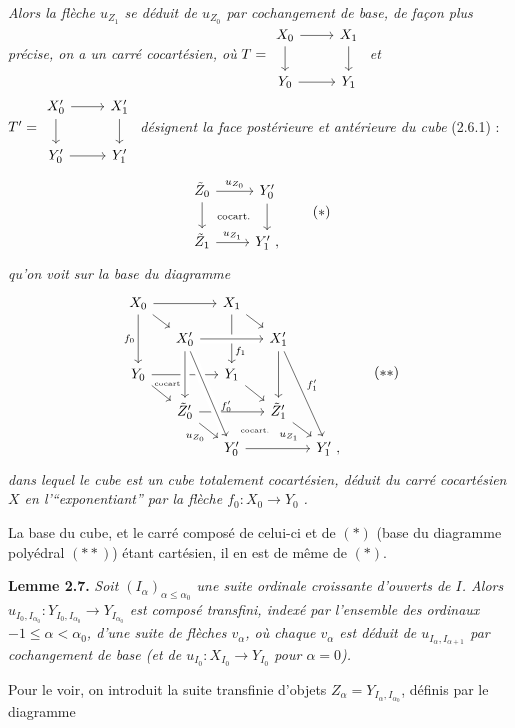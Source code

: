 \documentclass[11pt]{article}
\newcommand{\printedpage}[1]{\marginpar{\footnotesize p.~#1}}
\newcommand{\msp}[1]{\marginpar{\footnotesize [#1]}}
\begin{document}
\printedpage{18}

\msp{page 32}

\textit{Alors la flèche $u_{Z_1}$ se déduit de $u_{Z_0}$ par cochangement de base, de façon plus précise, on a un carré cocartésien, où} $T = \begin{tikzcd}[ampersand replacement=\&, baseline=(\tikzcdmatrixname.center)]
X_0 \arrow[r] \arrow[d] \& X_1 \arrow[d] \\
Y_0 \arrow[r] \& Y_1
\end{tikzcd}$ \textit{et} $T' = \begin{tikzcd}[ampersand replacement=\&, baseline=(\tikzcdmatrixname.center)]
X'_0 \arrow[r] \arrow[d] \& X'_1 \arrow[d] \\
Y'_0 \arrow[r] \& Y'_1
\end{tikzcd}$ \textit{désignent la face postérieure et antérieure du cube} \textup{(2.6.1) :}
\[
\begin{tikzcd}
\tilde{Z}_0 \arrow[r, "u_{Z_0}"] \arrow[d] \arrow[dr, phantom, "\text{\scriptsize cocart.}"] & Y'_0 \arrow[d] \\
\tilde{Z}_1 \arrow[r, "u_{Z_1}"] & Y'_1 \ ,
\end{tikzcd}
\tag*{$(*)$}
\]
\textit{qu'on voit sur la base du diagramme}
\[
\begin{tikzcd}[row sep=small, column sep=small]
X_0 \arrow[rr] \arrow[dr] \arrow[dd, "f_0"'] & & X_1 \arrow[dr] \arrow[dd, "f_1" near end] & & \\
 & X'_0 \arrow[rr, crossing over] & & X'_1 \arrow[dd] \arrow[dddr, "f'_1"] & \\
Y_0 \arrow[rr] \arrow[dr] \arrow[dr, phantom, shift left=2ex, "\text{\tiny cocart.}"] & & Y_1 \arrow[dr] & & \\
 & \tilde{Z}'_0 \arrow[rr] \arrow[dr, "u_{Z_0}"'] \arrow[from=uu, crossing over] & & \tilde{Z}'_1 \arrow[dr, "u_{Z_1}"'] & \\
 & & Y'_0 \arrow[rr] \arrow[from=uuul, crossing over, "f'_0" near end] \arrow[ur, phantom, "\text{\tiny cocart.}"] & & Y'_1 \ ,
\end{tikzcd} %
\tag*{$(**)$}
\]
\textit{dans lequel le cube est un cube totalement cocartésien, déduit du carré cocartésien $X$ en l'“exponentiant” par la flèche $f_0 : X_0 \longrightarrow Y_0$} \textit{.}

La base du cube, et le carré
\msp{page 33}
composé de celui-ci et de $(*)$ (base du diagramme polyédral $(**)$) étant cartésien, il en est de même de $(*)$.

\textbf{Lemme 2.7.} \textit{Soit $(I_\alpha)_{\alpha\leq\alpha_0}$ une suite ordinale croissante d'ouverts de $I$. Alors $u_{I_0,I_{\alpha_0}} : Y_{I_0,I_{\alpha_0}} \longrightarrow Y_{I_{\alpha_0}}$ est composé transfini, indexé par l'ensemble des ordinaux $-1 \leq \alpha < \alpha_0$, d'une suite de flèches $v_\alpha$, où chaque $v_\alpha$ est déduit de $u_{I_\alpha,I_{\alpha+1}}$ par cochangement de base (et de $u_{I_0} : X_{I_0} \longrightarrow Y_{I_0}$ pour $\alpha = 0$).}

Pour le voir, on introduit la suite transfinie d'objets $Z_\alpha = Y_{I_\alpha,I_{\alpha_0}}$, définis par le diagramme
\end{document}

